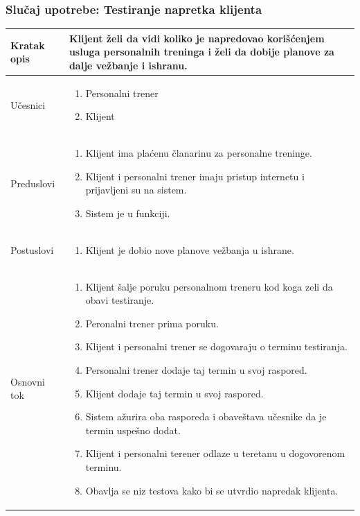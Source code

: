 \subsubsection{Slučaj upotrebe: Testiranje napretka klijenta}

\begin{longtable}{| p{} | p{} |} 
\hline
    Kratak opis & Klijent želi da vidi koliko je napredovao korišćenjem usluga personalnih treninga i želi da dobije planove za dalje vežbanje i ishranu. \\ 
\hline    
    Učesnici & \begin{enumerate}
    \item Personalni trener
    \item Klijent
   \end{enumerate}\\
\hline
   Preduslovi & 
   \begin{enumerate}
    \item Klijent ima plaćenu članarinu za personalne treninge.
    \item Klijent i personalni trener imaju pristup internetu i prijavljeni su na sistem.
    \item Sistem je u funkciji.
   \end{enumerate}\\
\hline  
    Postuslovi &
    \begin{enumerate}
    \item Klijent je dobio nove planove vežbanja u ishrane.
    \end{enumerate}\\
\hline
    Osnovni tok & 
    \begin{enumerate}
    \item Klijent šalje poruku personalnom treneru kod koga zeli da obavi testiranje.
    \item Peronalni trener prima poruku.
    \item Klijent i personalni trener se dogovaraju o terminu testiranja.
    \item Personalni trener dodaje taj termin u svoj raspored.
    \item Klijent dodaje taj termin u svoj raspored.
    \item Sistem ažurira oba rasporeda i obaveštava učesnike da je termin uspešno dodat.
    \item Klijent i personalni terener odlaze u teretanu u dogovorenom terminu.
    \item Obavlja se niz testova kako bi se utvrdio napredak klijenta.

\end{enumerate}
\end{longtable}
